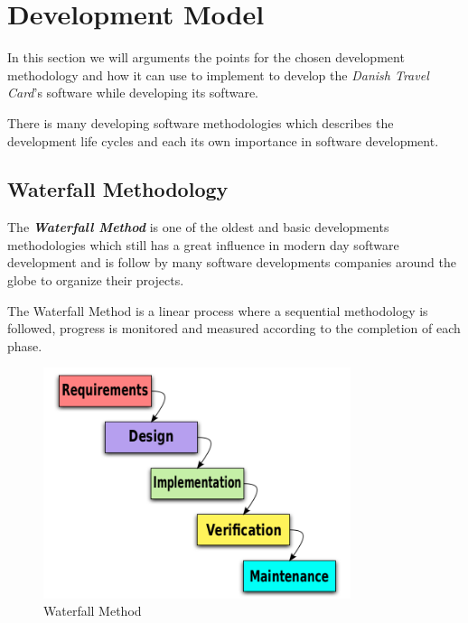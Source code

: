 \renewcommand{\headrulewidth}{0.1pt}
\renewcommand{\footrulewidth}{0.1pt}

\section*{Development Model}

In this section we will arguments the points for the chosen development methodology and how it can use to implement to develop the  \textit{Danish Travel Card}'s software while developing its software.

There is many developing software methodologies which describes the development life cycles and each its own importance in software development.
 
\subsection*{Waterfall Methodology}

The \textbf{\emph{Waterfall Method}} is one of the oldest and basic developments methodologies which still has a great influence in modern day software development and is follow by many software developments companies around the globe to organize their projects.

The Waterfall Method is a linear process where a sequential methodology is followed, progress is monitored and measured according to the completion of each phase.

\begin{figure}[ht!]
\centering
\includegraphics[width=90mm]{graphics/Waterfall_model.png}
\caption{Waterfall Method}
\label{overflow}
\end{figure}


